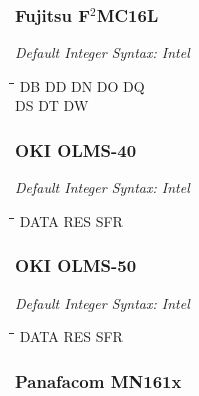 \subsubsection{Fujitsu F$^{2}$MC16L}

{\em Default Integer Syntax: Intel}

{\tt\begin{tabbing} 
\hspace{3cm}\=\hspace{3cm}\=\hspace{3cm}\=\hspace{3cm}\=\kill
DB         \> DD          \> DN          \> DO         \> DQ \\
DS         \> DT          \> DW \\
\end{tabbing}}

\subsubsection{OKI OLMS-40}

{\em Default Integer Syntax: Intel}

{\tt\begin{tabbing} 
\hspace{3cm}\=\hspace{3cm}\=\hspace{3cm}\=\hspace{3cm}\=\kill
DATA       \> RES         \> SFR \\
\end{tabbing}}

\subsubsection{OKI OLMS-50}

{\em Default Integer Syntax: Intel}

{\tt\begin{tabbing} 
\hspace{3cm}\=\hspace{3cm}\=\hspace{3cm}\=\hspace{3cm}\=\kill
DATA       \> RES         \> SFR \\
\end{tabbing}}

\subsubsection{Panafacom MN161x}

